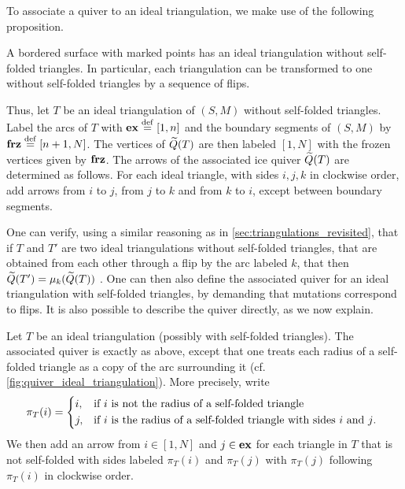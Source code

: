 To associate a quiver to an ideal triangulation, we make use of the following
proposition.

\begin{proposition}

	A bordered surface with marked points has an ideal triangulation without self-folded
	triangles. In particular, each triangulation can be transformed to one without
	self-folded triangles by a sequence of flips.
\end{proposition}

Thus, let $T$ be an ideal triangulation of $(S, M)$ without self-folded triangles.
Label the arcs of $T$ with $\mathbf{ex} \overset{\mathrm{def}}{=} [1,n]$ and the boundary segments of $(S, M)$ by
$\mathbf{frz} \overset{\mathrm{def}}{=} [n+1, N]$. The vertices of $\widetilde{Q}(T)$ are then labeled $[1, N]$ with the
frozen vertices given by $\mathbf{frz}$. The arrows of the associated ice quiver $\widetilde{Q}(T)$ are
determined as follows. For each ideal triangle, with sides $i,j,k$ in clockwise order,
add arrows from $i$ to $j$, from $j$ to $k$ and from $k$ to $i$, except between
boundary segments.

One can verify, using a similar reasoning as in \cref{sec:triangulations_revisited},
that if $T$ and $T'$ are two ideal triangulations without self-folded triangles, that
are obtained from each other through a flip by the arc labeled $k$, that then $\widetilde{Q}(T')
	= \mu_k(\widetilde{Q}(T))$ \parencite[Proposition 4.8]{FominShapiroThurston2008CATriangulatedSurfacesI}. One can then
also define the associated quiver for an ideal triangulation with self-folded
triangles, by demanding that mutations correspond to flips. It is also possible to
describe the quiver directly, as we now explain.

Let $T$ be an ideal triangulation (possibly with self-folded triangles). The associated
quiver is exactly as above, except that one treats each radius of a self-folded
triangle as a copy of the arc surrounding it (cf. \cref{fig:quiver_ideal_triangulation}). More precisely, write
\begin{equation*}
	\pi_T(i) = \begin{dcases*}
		i, & if $i$ is not the radius of a self-folded triangle                     \\
		j, & if $i$ is the radius of a self-folded triangle with sides $i$ and $j$.
	\end{dcases*}
\end{equation*}
%
We then add an arrow from $i \in [1, N]$ and $j \in \mathbf{ex}$ for each triangle in $T$ that
is not self-folded with sides labeled $\pi_T(i)$ and $\pi_T(j)$ with $\pi_T(j)$
following $\pi_T(i)$ in clockwise order.

